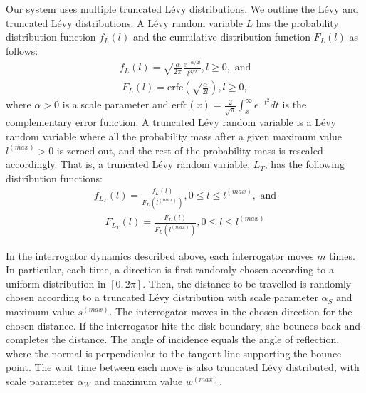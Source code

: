 Our system uses multiple truncated L\'{e}vy distributions. We outline the L\'{e}vy and truncated L\'{e}vy distributions. A L\'{e}vy random variable $L$ has the probability distribution function $f_L\left(l\right)$ and the cumulative distribution function $F_L\left(l\right)$ as follows:
\begin{eqnarray}
f_L\left(l\right) = \sqrt{\frac{\alpha}{2\pi}} \frac{e^{-\alpha/2l}}{l^{3/2}}, l \geq 0, \mbox{ and}
\label{Equation: Levy PDF}
\end{eqnarray}
\begin{eqnarray}	
F_L\left(l\right) = \mbox{erfc}\left(\sqrt{\frac{\alpha}{2l}}\right), l \geq 0,
\label{Equation: Levy CDF}
\end{eqnarray}
where $\alpha > 0$ is a scale parameter and $\mbox{erfc}\left(x\right) = \frac{2}{\sqrt{\pi}} \int_x^{\infty}e^{-t^2}dt$ is the complementary error function. A truncated L\'{e}vy random variable is a L\'{e}vy random variable where all the probability mass after a given maximum value $l^{(max)} > 0$ is zeroed out, and the rest of the probability mass is rescaled accordingly. That is, a truncated L\'{e}vy random variable, $L_T$, has the following distribution functions:
\begin{eqnarray}
f_{L_T}\left(l\right) = \frac{f_L\left(l\right)}{F_L\left(l^{(max)}\right)}, 0 \leq l \leq l^{(max)}, \mbox{ and}
\label{Equation: Truncated Levy PDF}
\end{eqnarray}
\begin{eqnarray}
F_{L_T}\left(l\right) = \frac{F_L\left(l\right)}{F_L\left(l^{(max)}\right)}, 0 \leq l \leq l^{(max)}
\label{Equation: Truncated Levy CDF}
\end{eqnarray}

In the interrogator dynamics described above, each interrogator moves $m$ times. In particular, each time, a direction is first randomly chosen according to a uniform distribution in $\left[0, 2 \pi \right]$. Then, the distance to be travelled is randomly chosen according to a truncated L\'{e}vy distribution with scale parameter $\alpha_S$ and maximum value $s^{(max)}$. The interrogator moves in the chosen direction for the chosen distance. If the interrogator hits the disk boundary, she bounces back and completes the distance. The angle of incidence equals the angle of reflection, where the normal is perpendicular to the tangent line supporting the bounce point. The wait time between each move is also truncated L\'{e}vy distributed, with scale parameter $\alpha_W$ and maximum value $w^{(max)}$.

